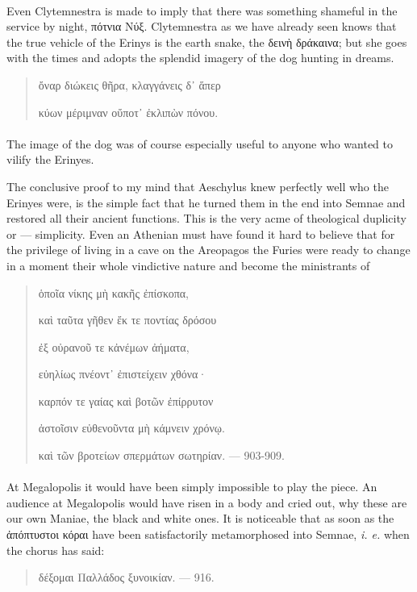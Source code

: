 \documentclass[a4paper, 11pt, oneside, polutonikogreek, english]{article}
\begin{document}
\paragraph{}
Even Clytemnestra is made to imply that there was something shameful in the service by night, πότνια Νύξ. Clytemnestra as we have already seen knows that the true vehicle of the Erinys is the earth snake, the δεινὴ δράκαινα; but she goes with the times and adopts the splendid imagery of the dog hunting in dreams.
\begin{quotation}
ὄναρ διώκεις θῆρα, κλαγγάνεις δ᾽ ἅπερ

κύων μέριμναν οὔποτ᾽ ἐκλιπὼν πόνου.
\end{quotation}
\paragraph{}
The image of the dog was of course especially useful to anyone who wanted to vilify the Erinyes.

The conclusive proof to my mind that Aeschylus knew perfectly well who the Erinyes were, is the simple fact that he turned them in the end into Semnae and restored all their ancient functions. This is the very acme of theological duplicity or --- simplicity. Even an Athenian must have found it hard to believe that for the privilege of living in a cave on the Areopagos the Furies were ready to change in a moment their whole vindictive nature and become the ministrants of
\begin{quotation}
ὁποῖα νίκης μὴ κακῆς ἐπίσκοπα,

καὶ ταῦτα γῆθεν ἔκ τε ποντίας δρόσου

ἐξ οὐρανοῦ τε κἀνέμων ἀήματα,

εὐηλίως πνέοντ᾽ ἐπιστείχειν χθόνα·

καρπόν τε γαίας καὶ βοτῶν ἐπίρρυτον

ἀστοῖσιν εὐθενοῦντα μὴ κάμνειν χρόνῳ.

καὶ τῶν βροτείων σπερμάτων σωτηρίαν. --- 903-909.
\end{quotation}
\paragraph{}
At Megalopolis it would have been simply impossible to play the piece. An audience at Megalopolis would have risen in a body and cried out, why these are our own Maniae, the black and white ones. It is noticeable that as soon as the ἀπόπτυστοι κόραι have been satisfactorily metamorphosed into Semnae, \emph{i. e.} when the chorus has said:
\begin{quotation}
δέξομαι Παλλάδος ξυνοικίαν. --- 916.
\end{quotation}
\end{document}
